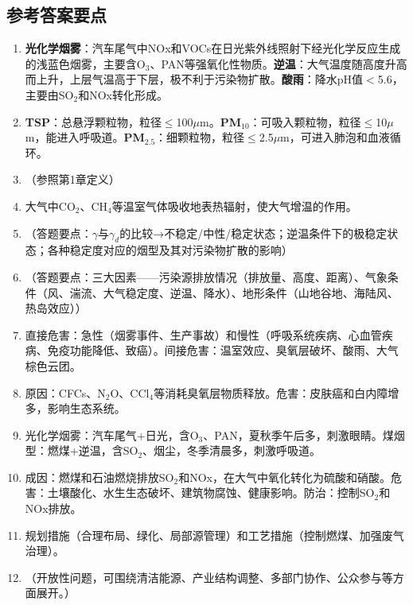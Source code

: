 \subsection*{参考答案要点}

\begin{enumerate}[leftmargin=*, itemsep=5pt]
    \item \textbf{光化学烟雾}：汽车尾气中NOx和VOCs在日光紫外线照射下经光化学反应生成的浅蓝色烟雾，主要含O$_3$、PAN等强氧化性物质。\textbf{逆温}：大气温度随高度升高而上升，上层气温高于下层，极不利于污染物扩散。\textbf{酸雨}：降水pH值$<$5.6，主要由SO$_2$和NOx转化形成。

    \item \textbf{TSP}：总悬浮颗粒物，粒径$\leq$100$\mu$m。\textbf{PM$_{10}$}：可吸入颗粒物，粒径$\leq$10$\mu$m，能进入呼吸道。\textbf{PM$_{2.5}$}：细颗粒物，粒径$\leq$2.5$\mu$m，可进入肺泡和血液循环。

    \item （参照第1章定义）

    \item 大气中CO$_2$、CH$_4$等温室气体吸收地表热辐射，使大气增温的作用。

    \item （答题要点：$\gamma$与$\gamma_d$的比较→不稳定/中性/稳定状态；逆温条件下的极稳定状态；各种稳定度对应的烟型及其对污染物扩散的影响）

    \item （答题要点：三大因素——污染源排放情况（排放量、高度、距离）、气象条件（风、湍流、大气稳定度、逆温、降水）、地形条件（山地谷地、海陆风、热岛效应））

    \item 直接危害：急性（烟雾事件、生产事故）和慢性（呼吸系统疾病、心血管疾病、免疫功能降低、致癌）。间接危害：温室效应、臭氧层破坏、酸雨、大气棕色云团。

    \item 原因：CFCs、N$_2$O、CCl$_4$等消耗臭氧层物质释放。危害：皮肤癌和白内障增多，影响生态系统。

    \item 光化学烟雾：汽车尾气+日光，含O$_3$、PAN，夏秋季午后多，刺激眼睛。煤烟型：燃煤+逆温，含SO$_2$、烟尘，冬季清晨多，刺激呼吸道。

    \item 成因：燃煤和石油燃烧排放SO$_2$和NOx，在大气中氧化转化为硫酸和硝酸。危害：土壤酸化、水生生态破坏、建筑物腐蚀、健康影响。防治：控制SO$_2$和NOx排放。

    \item 规划措施（合理布局、绿化、局部源管理）和工艺措施（控制燃煤、加强废气治理）。

    \item （开放性问题，可围绕清洁能源、产业结构调整、多部门协作、公众参与等方面展开。）
\end{enumerate}

\newpage

\newpage